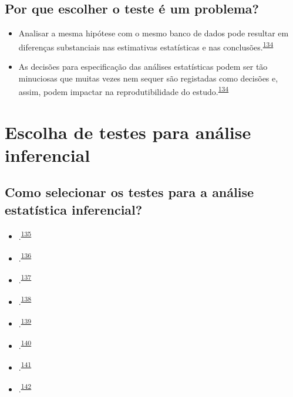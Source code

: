 \documentclass[
  a4paper,
]{book}
\begin{document}
\hypertarget{por-que-escolher-o-teste-uxe9-um-problema}{%
\subsection{Por que escolher o teste é um problema?}\label{por-que-escolher-o-teste-uxe9-um-problema}}

\begin{itemize}
\item
  Analisar a mesma hipótese com o mesmo banco de dados pode resultar em diferenças substanciais nas estimativas estatísticas e nas conclusões.\textsuperscript{\protect\hyperlink{ref-Breznau2022}{134}}
\item
  As decisões para especificação das análises estatísticas podem ser tão minuciosas que muitas vezes nem sequer são registadas como decisões e, assim, podem impactar na reprodutibilidade do estudo.\textsuperscript{\protect\hyperlink{ref-Breznau2022}{134}}
\end{itemize}

\hypertarget{escolha-analise-inferencial}{%
\section{Escolha de testes para análise inferencial}\label{escolha-analise-inferencial}}

\hypertarget{como-selecionar-os-testes-para-a-anuxe1lise-estatuxedstica-inferencial}{%
\subsection{Como selecionar os testes para a análise estatística inferencial?}\label{como-selecionar-os-testes-para-a-anuxe1lise-estatuxedstica-inferencial}}

\begin{itemize}
\item
  .\textsuperscript{\protect\hyperlink{ref-dwivedi2019}{135}}
\item
  .\textsuperscript{\protect\hyperlink{ref-Dwivedi2022}{136}}
\item
  .\textsuperscript{\protect\hyperlink{ref-Kim2017}{137}}
\item
  .\textsuperscript{\protect\hyperlink{ref-marusteri2010}{138}}
\item
  .\textsuperscript{\protect\hyperlink{ref-mishra2019}{139}}
\item
  .\textsuperscript{\protect\hyperlink{ref-ray2021}{140}}
\item
  .\textsuperscript{\protect\hyperlink{ref-nayak2011}{141}}
\item
  .\textsuperscript{\protect\hyperlink{ref-shankar2014}{142}}
\end{itemize}
\end{document}
